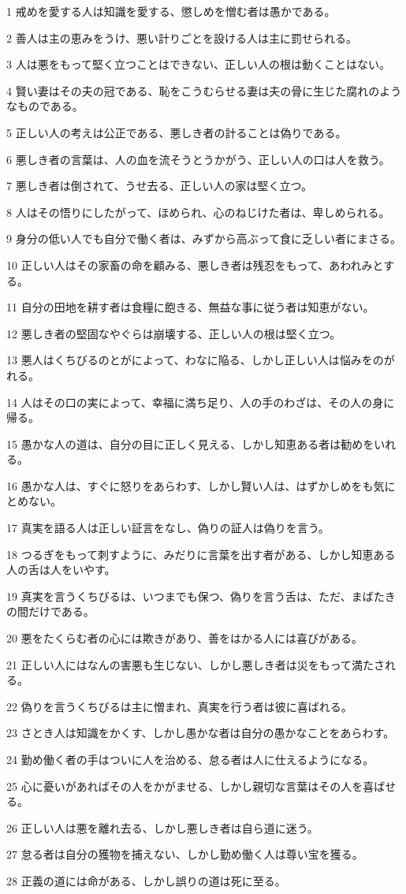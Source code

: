 \par 1 戒めを愛する人は知識を愛する、懲しめを憎む者は愚かである。
\par 2 善人は主の恵みをうけ、悪い計りごとを設ける人は主に罰せられる。
\par 3 人は悪をもって堅く立つことはできない、正しい人の根は動くことはない。
\par 4 賢い妻はその夫の冠である、恥をこうむらせる妻は夫の骨に生じた腐れのようなものである。
\par 5 正しい人の考えは公正である、悪しき者の計ることは偽りである。
\par 6 悪しき者の言葉は、人の血を流そうとうかがう、正しい人の口は人を救う。
\par 7 悪しき者は倒されて、うせ去る、正しい人の家は堅く立つ。
\par 8 人はその悟りにしたがって、ほめられ、心のねじけた者は、卑しめられる。
\par 9 身分の低い人でも自分で働く者は、みずから高ぶって食に乏しい者にまさる。
\par 10 正しい人はその家畜の命を顧みる、悪しき者は残忍をもって、あわれみとする。
\par 11 自分の田地を耕す者は食糧に飽きる、無益な事に従う者は知恵がない。
\par 12 悪しき者の堅固なやぐらは崩壊する、正しい人の根は堅く立つ。
\par 13 悪人はくちびるのとがによって、わなに陥る、しかし正しい人は悩みをのがれる。
\par 14 人はその口の実によって、幸福に満ち足り、人の手のわざは、その人の身に帰る。
\par 15 愚かな人の道は、自分の目に正しく見える、しかし知恵ある者は勧めをいれる。
\par 16 愚かな人は、すぐに怒りをあらわす、しかし賢い人は、はずかしめをも気にとめない。
\par 17 真実を語る人は正しい証言をなし、偽りの証人は偽りを言う。
\par 18 つるぎをもって刺すように、みだりに言葉を出す者がある、しかし知恵ある人の舌は人をいやす。
\par 19 真実を言うくちびるは、いつまでも保つ、偽りを言う舌は、ただ、まばたきの間だけである。
\par 20 悪をたくらむ者の心には欺きがあり、善をはかる人には喜びがある。
\par 21 正しい人にはなんの害悪も生じない、しかし悪しき者は災をもって満たされる。
\par 22 偽りを言うくちびるは主に憎まれ、真実を行う者は彼に喜ばれる。
\par 23 さとき人は知識をかくす、しかし愚かな者は自分の愚かなことをあらわす。
\par 24 勤め働く者の手はついに人を治める、怠る者は人に仕えるようになる。
\par 25 心に憂いがあればその人をかがませる、しかし親切な言葉はその人を喜ばせる。
\par 26 正しい人は悪を離れ去る、しかし悪しき者は自ら道に迷う。
\par 27 怠る者は自分の獲物を捕えない、しかし勤め働く人は尊い宝を獲る。
\par 28 正義の道には命がある、しかし誤りの道は死に至る。

